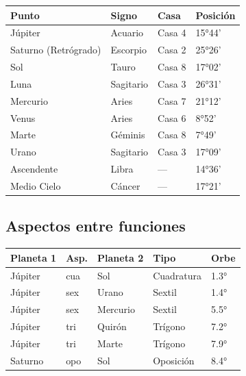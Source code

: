 \documentclass[11pt,a4paper]{article}
\begin{document}
\begin{center}
\begin{tabular}{llll}
\toprule
\textbf{Punto} & \textbf{Signo} & \textbf{Casa} & \textbf{Posición} \\
\midrule

Júpiter &
Acuario &
Casa 4 &
15°44' \\

Saturno (Retrógrado) &
Escorpio &
Casa 2 &
25°26' \\

Sol &
Tauro &
Casa 8 &
17°02' \\

Luna &
Sagitario &
Casa 3 &
26°31' \\

Mercurio &
Aries &
Casa 7 &
21°12' \\

Venus &
Aries &
Casa 6 &
8°52' \\

Marte &
Géminis &
Casa 8 &
7°49' \\

Urano &
Sagitario &
Casa 3 &
17°09' \\

Ascendente &
Libra &
--- &
14°36' \\

Medio Cielo &
Cáncer &
--- &
17°21' \\

\bottomrule
\end{tabular}
\end{center}

\vspace{0.8cm}

\subsection*{Aspectos entre funciones}

\begin{center}
\begin{tabular}{lllll}
  \toprule
  \textbf{Planeta 1} & \textbf{Asp.} & \textbf{Planeta 2} & \textbf{Tipo} & \textbf{Orbe} \\
  \midrule
  Júpiter & cua & Sol & Cuadratura & 1.3° \\
  Júpiter & sex & Urano & Sextil & 1.4° \\
  Júpiter & sex & Mercurio & Sextil & 5.5° \\
  Júpiter & tri & Quirón & Trígono & 7.2° \\
  Júpiter & tri & Marte & Trígono & 7.9° \\
  Saturno & opo & Sol & Oposición & 8.4° \\
  \bottomrule
\end{tabular}
\end{center}
\end{document}
